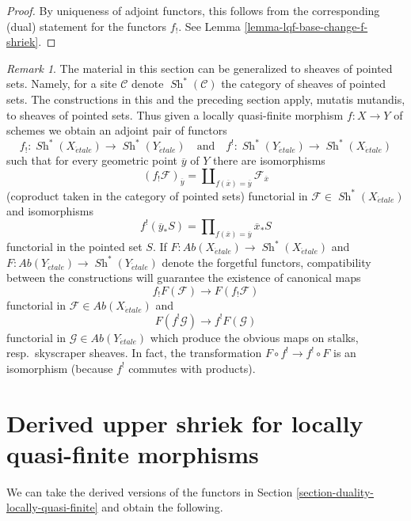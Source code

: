 \documentclass{stacks-project}
\theoremstyle{plain}
\theoremstyle{definition}
\theoremstyle{remark}
\newtheorem{remark}[subsection]{Remark}
\numberwithin{equation}{subsection}
\def\Sh{\mathop{\mathit{Sh}}\nolimits}
\def\etale{{\acute{e}tale}}
\begin{document}
\begin{proof}
By uniqueness of adjoint functors, this follows from
the corresponding (dual) statement for the functors $f_!$.
See Lemma \ref{lemma-lqf-base-change-f-shriek}.
\end{proof}

\begin{remark}
\label{remark-pointed-sets}
The material in this section can be generalized to sheaves of pointed sets.
Namely, for a site $\mathcal{C}$ denote $\Sh^*(\mathcal{C})$ the category of
sheaves of pointed sets. The constructions in this and the preceding section
apply, mutatis mutandis, to sheaves of pointed sets. Thus given a locally
quasi-finite morphism $f : X \to Y$ of schemes we obtain
an adjoint pair of functors
$$
f_! : \Sh^*(X_\etale) \longrightarrow \Sh^*(Y_\etale)
\quad\text{and}\quad
f^! : \Sh^*(Y_\etale) \longrightarrow \Sh^*(X_\etale)
$$
such that for every geometric point $\overline{y}$ of $Y$ there are
isomorphisms
$$
(f_!\mathcal{F})_{\overline{y}} =
\coprod\nolimits_{f(\overline{x}) = \overline{y}}
\mathcal{F}_{\overline{x}}
$$
(coproduct taken in the category of pointed sets) functorial in
$\mathcal{F} \in \Sh^*(X_\etale)$ and isomorphisms
$$
f^!(\overline{y}_*S) =
\prod\nolimits_{f(\overline{x}) = \overline{y}}
\overline{x}_*S
$$
functorial in the pointed set $S$. If
$F : \textit{Ab}(X_\etale) \to \Sh^*(X_\etale)$ and
$F : \textit{Ab}(Y_\etale) \to \Sh^*(Y_\etale)$
denote the forgetful functors, compatibility between the constructions
will guarantee the existence of canonical maps
$$
f_!F(\mathcal{F}) \longrightarrow F(f_!\mathcal{F})
$$
functorial in $\mathcal{F} \in \textit{Ab}(X_\etale)$ and
$$
F(f^!\mathcal{G}) \longrightarrow f^!F(\mathcal{G})
$$
functorial in $\mathcal{G} \in \textit{Ab}(Y_\etale)$
which produce the obvious maps on stalks, resp.\ skyscraper sheaves.
In fact, the transformation $F \circ f^! \to f^! \circ F$ is an isomorphism
(because $f^!$ commutes with products).
\end{remark}







\section{Derived upper shriek for locally quasi-finite morphisms}
\label{section-derived-duality-locally-quasi-finite}

\noindent
We can take the derived versions of the functors in
Section \ref{section-duality-locally-quasi-finite}
and obtain the following.
\end{document}
